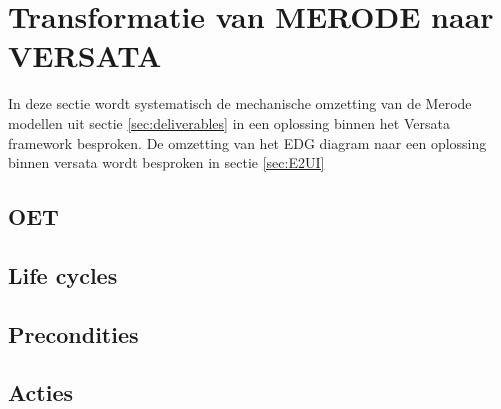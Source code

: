 \section{Transformatie van MERODE naar VERSATA}
\label{sec:mech_transform}
In deze sectie wordt systematisch de mechanische omzetting van de Merode modellen uit sectie \ref{sec:deliverables} in een oplossing binnen het Versata framework besproken.
De omzetting van het EDG diagram naar een oplossing binnen versata wordt besproken in sectie \ref{sec:E2UI}

\subsection{OET}
\label{sec:OET}
\subsection{Life cycles}
\label{sec:Life_cycles}
\subsection{Precondities}
\label{sec:precondities}
\subsection{Acties}
\label{sec:acties}
